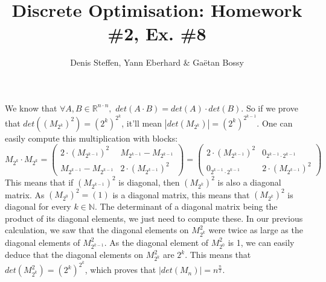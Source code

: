 \documentclass[a4paper,11pt,french]{article}
\title{Discrete Optimisation: Homework \#2, Ex. \#8}
\author{Denis Steffen, Yann Eberhard \& Gaëtan Bossy}
\begin{document}
\maketitle
We know that $\forall A,B\in\mathbb{R}^{n\cdot n},\,\,det(A\cdot B)=det(A)\cdot det(B)$. So if we prove that $det((M_{2^k})^2)=(2^k)^{2^k}$, it'll mean $|det(M_{2^k})|=(2^k)^{2^{k-1}}$. One can easily compute this multiplication with blocks: 
\begin{equation*}
M_{2^k}\cdot M_{2^k}=
\begin{pmatrix}
    2\cdot(M_{2^{k-1}})^2 & M_{2^{k-1}}-M_{2^{k-1}} \\ 
    M_{2^{k-1}}-M_{2^{k-1}} &  2\cdot(M_{2^{k-1}})^2
  \end{pmatrix}=
  \begin{pmatrix}
    2\cdot(M_{2^{k-1}})^2 & 0_{2^{k-1}\cdot 2^{k-1}} \\ 
    0_{2^{k-1}\cdot 2^{k-1}} &  2\cdot(M_{2^{k-1}})^2
  \end{pmatrix}
 \end{equation*}
 This means that if $(M_{2^{k-1}})^2$ is diagonal, then $(M_{2^{k}})^2$ is also a diagonal matrix. As $(M_{2^{0}})^2=(1)$ is a diagonal matrix, this means that $(M_{2^{k}})^2$ is diagonal for every $k\in\mathbb{N}$. The determinant of a diagonal matrix being the product of its diagonal elements, we just need to compute these. In our previous calculation, we saw that the diagonal elements on $M_{2^k}^2$ were twice as large as the diagonal elements of $M_{2^{k-1}}^2$. As the diagonal element of $M_{2^0}^2$ is 1, we can easily deduce that the diagonal elements on $M_{2^k}^2$ are $2^k$. This means that $det(M_{2^k}^2)=(2^k)^{2^k}$, which proves that $|det(M_n)|=n^{\frac{n}{2}}$.
  
\end{document}
